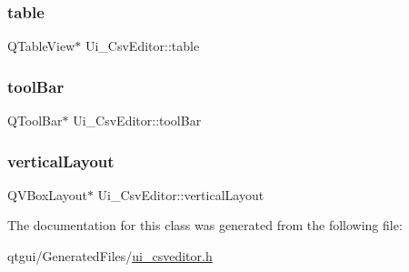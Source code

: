 \subsubsection{\texorpdfstring{table}{table}}
{\footnotesize\ttfamily Q\+Table\+View$\ast$ Ui\+\_\+\+Csv\+Editor\+::table}

\mbox{\label{class_ui___csv_editor_a0148a52976ad2e51f87f10d42c87d3c9}} 
\subsubsection{\texorpdfstring{toolBar}{toolBar}}
{\footnotesize\ttfamily Q\+Tool\+Bar$\ast$ Ui\+\_\+\+Csv\+Editor\+::tool\+Bar}

\mbox{\label{class_ui___csv_editor_a9dd49f17878a52494b4ba0354c836b67}} 
\subsubsection{\texorpdfstring{verticalLayout}{verticalLayout}}
{\footnotesize\ttfamily Q\+V\+Box\+Layout$\ast$ Ui\+\_\+\+Csv\+Editor\+::vertical\+Layout}



The documentation for this class was generated from the following file\+:\begin{DoxyCompactItemize}
\item 
qtgui/\+Generated\+Files/\mbox{\hyperlink{ui__csveditor_8h}{ui\+\_\+csveditor.\+h}}\end{DoxyCompactItemize}

